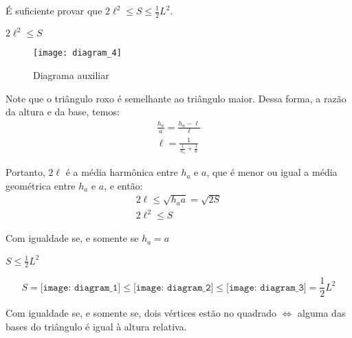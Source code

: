 É suficiente provar que $2\ell^2 \le S \le \frac{1}{2} L^2$.

\begin{lem*}
	$ 2\ell^2 \le S $
\end{lem*}

\begin{figure}[h]
	\begin{center}
		\texttt{[image: diagram\_4]}
		\caption{Diagrama auxiliar}
	\end{center}
\end{figure}

\begin{dem*}
	Note que o triângulo roxo é semelhante ao triângulo maior. Dessa forma, a razão da altura e da base, temos:
	\begin{gather*}
		\frac{h_a}{a} = \frac{h_a - \ell}{\ell}\\
		\ell = \frac{1}{\frac{1}{h_a} + \frac{1}{a}}
	\end{gather*}

	Portanto, $2\ell$ é a média harmônica entre $h_a$ e $a$, que é menor ou igual a média geométrica entre $h_a$ e $a$, e então:
	\begin{gather*}
		2\ell \le \sqrt{h_a a} = \sqrt{2S} \\
		2\ell^2 \le S
	\end{gather*}

	Com igualdade se, e somente se $h_a = a$
\end{dem*}

\begin{lem*}
	$ S \le \frac{1}{2} L^2 $
\end{lem*}

\begin{dem*}
	\begin{equation*}
		S =
		\texttt{[image: diagram\_1]}
		\le
		\texttt{[image: diagram\_2]}
		\le
		\texttt{[image: diagram\_3]}
		=
		\frac{1}{2} L^2
	\end{equation*}

	Com igualdade se, e somente se, dois vértices estão no quadrado $\iff$ alguma das bases do triângulo é igual à altura relativa.
\end{dem*}
